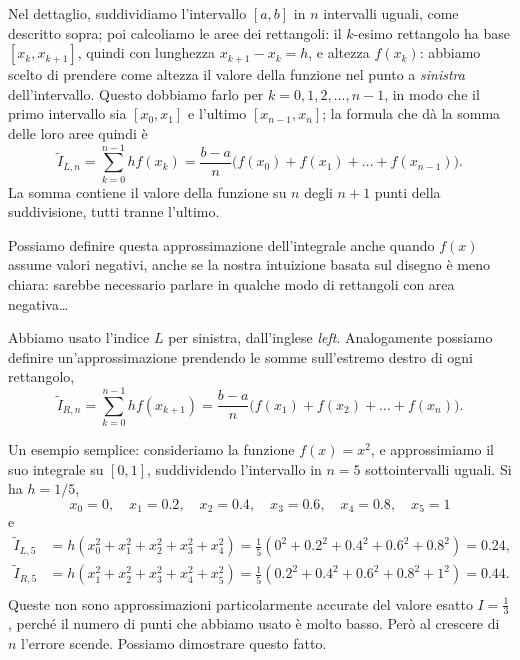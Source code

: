 \documentclass[a4paper]{report}
\theoremstyle{definition}
\theoremstyle{remark}
\newcommand{\checkkey}[1]{%
        \ifstrequal{#1}{inf}{\setbool{showcontent}{true}}{}%
    }
\newenvironment{conditional}[1][]{%
        \setbool{showcontent}{false}%
        \forcsvlist\checkkey{#1}%
        \ifbool{showcontent}{\begingroup}{\expandafter\comment}%
    }{%
        \ifbool{showcontent}{\endgroup}{\expandafter\endcomment}%
    }
\newcommand{\checkkey}[1]{%
        \ifstrequal{#1}{ich}{\setbool{showcontent}{true}}{}%
    }
\newenvironment{conditional}[1][]{%
        \setbool{showcontent}{false}%
        \forcsvlist\checkkey{#1}%
        \ifbool{showcontent}{\begingroup}{\expandafter\comment}%
    }{%
        \ifbool{showcontent}{\endgroup}{\expandafter\endcomment}%
    }
\begin{document}
\begin{conditional}[ich]
\begin{center}
\end{center}
Nel dettaglio, suddividiamo l'intervallo $[a,b]$ in $n$ intervalli uguali, come descritto sopra; poi calcoliamo le aree dei rettangoli: il $k$-esimo rettangolo ha base $[x_{k},x_{k+1}]$, quindi con lunghezza $x_{k+1}-x_k=h$, e altezza $f(x_k)$: abbiamo scelto di prendere come altezza il valore della funzione nel punto a \emph{sinistra} dell'intervallo. Questo dobbiamo farlo per $k=0,1,2,\dots,n-1$, in modo che il primo intervallo sia $[x_0,x_1]$ e l'ultimo $[x_{n-1},x_n]$; la formula che dà la somma delle loro aree quindi è
\[
\tilde{I}_{L,n} = \sum_{k=0}^{n-1} hf(x_k) = \frac{b-a}{n} \biggl( f(x_0) + f(x_1) + \dots + f(x_{n-1}) \biggr).
\]
La somma contiene il valore della funzione su $n$ degli $n+1$ punti della suddivisione, tutti tranne l'ultimo.

Possiamo definire questa approssimazione dell'integrale anche quando $f(x)$ assume valori negativi, anche se la nostra intuizione basata sul disegno è meno chiara: sarebbe necessario parlare in qualche modo di rettangoli con area negativa\dots

Abbiamo usato l'indice $L$ per sinistra, dall'inglese \emph{left}. Analogamente possiamo definire un'approssimazione prendendo le somme sull'estremo destro di ogni rettangolo, 
\[
\tilde{I}_{R,n} = \sum_{k=0}^{n-1} hf(x_{k+1}) = \frac{b-a}{n} \biggl( f(x_1) + f(x_2) + \dots + f(x_{n}) \biggr).
\]

Un esempio semplice: consideriamo la funzione $f(x)=x^2$, e approssimiamo il suo integrale su $[0,1]$, suddividendo l'intervallo in $n=5$ sottointervalli uguali. Si ha $h=1/5$,
\[
x_0 = 0, \quad x_1 = 0.2, \quad x_2=0.4,\quad x_3=0.6,\quad x_4 = 0.8,\quad x_5=1
\]
e
\begin{align*}
    \tilde{I}_{L,5} &= h (x_0^2+x_1^2+x_2^2+x_3^2+x_4^2) = \frac{1}{5}\left(0^2+0.2^2+0.4^2+0.6^2+0.8^2\right) = 0.24,\\
    \tilde{I}_{R,5} &= h (x_1^2+x_2^2+x_3^2+x_4^2+x_5^2) = \frac{1}{5}\left(0.2^2+0.4^2+0.6^2+0.8^2+1^2\right) = 0.44.\\
\end{align*}
Queste non sono approssimazioni particolarmente accurate del valore esatto $I=\frac{1}{3}$, perché il numero di punti che abbiamo usato è molto basso. Però al crescere di $n$ l'errore scende. Possiamo dimostrare questo fatto.

\end{conditional}
\end{document}
